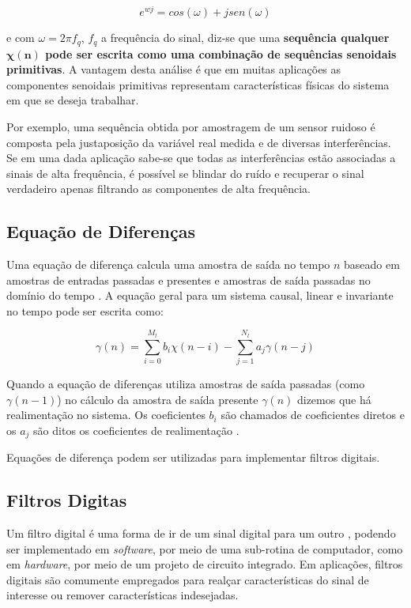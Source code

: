 {\begin{equation}
\label{eq:euler-equation}
e^{wj} = cos(\omega) + j sen(\omega)
\end{equation}

e com $\omega = 2\pi f_q$, $f_q$ a frequência do sinal, diz-se que uma \textbf{sequência
qualquer $\bm{\chi(n)}$ pode ser escrita como uma combinação de sequências senoidais
primitivas}. A vantagem desta análise é que em muitas aplicações as componentes
senoidais primitivas representam características físicas do sistema em que se deseja trabalhar. 

Por exemplo, uma sequência obtida por amostragem de um sensor ruidoso é composta
pela justaposição da variável real medida e de diversas interferências. Se em
uma dada aplicação sabe-se que todas as interferências estão associadas a sinais
de alta frequência, é possível se blindar do ruído e recuperar o sinal verdadeiro
apenas filtrando as componentes de alta frequência.

\subsection{Equação de Diferenças}

Uma equação de diferença calcula uma amostra de saída no tempo $n$ baseado em amostras de entradas passadas e presentes e amostras de saída passadas no domínio do tempo \cite{classnote-on-difference-equation}. A equação geral para um sistema causal, linear e invariante no tempo pode ser escrita como:

\begin{equation}
\gamma(n) = \sum_{i=0}^{M_l}b_i \chi(n-i) - \sum_{j=1}^{N_l}a_j \gamma(n-j) 
\end{equation}

Quando a equação de diferenças utiliza amostras de saída passadas (como $\gamma(n-1)$) no cálculo da amostra de saída presente $\gamma(n)$ dizemos que há realimentação no sistema. Os coeficientes $b_i$ são chamados de coeficientes diretos e os $a_j$ são ditos os coeficientes de realimentação \cite{classnote-on-difference-equation}.

Equações de diferença podem ser utilizadas para implementar filtros digitais.

\subsection{Filtros Digitas}

Um filtro digital é uma forma de ir de um sinal digital para um outro \cite{classnote-on-intro-to-digital-filters}, podendo ser implementado em \textit{software}, por meio de uma sub-rotina de computador, como em \textit{hardware}, por meio de um projeto de circuito integrado. Em aplicações, filtros digitais são comumente empregados para realçar características do sinal de interesse ou remover características indesejadas.

}
